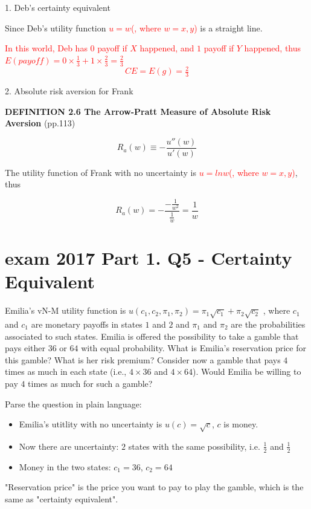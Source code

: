 \documentclass{article}
\begin{document}
1. Deb's certainty equivalent

Since Deb's utility function \textcolor{red}{$u = w$(, where $w = x,y$)} is a straight line.

\textcolor{red}{
In this world, Deb has $0$ payoff if $X$ happened, and $1$ payoff if $Y$ happened, thus $E(payoff) = 0 \times \tfrac1{3}   + 1 \times \tfrac2{3} =  \tfrac2{3}$
$$CE =  E(g) =  \tfrac2{3}$$}

2. Absolute risk aversion for Frank

\begin{mdframed}[backgroundcolor=blue!20,linecolor=white]
\textbf{DEFINITION 2.6 The Arrow-Pratt Measure of Absolute Risk Aversion} (pp.113)

$$R_a(w) \equiv -\frac{u''(w)}{u'(w)}$$

\end{mdframed}


The utility function of Frank with no uncertainty is \textcolor{red}{$u = ln  w $(, where $w = x,y$)}, thus

$$R_a(w) = -\frac{-\frac{1}{w^2}}{\frac{1}{w}}=\frac{1}{w}$$

\newpage 

\section{exam 2017 Part 1. Q5 - Certainty Equivalent}

Emilia's vN-M utility function is $u(c_1,c_2,\pi_1, \pi_2) = \pi_1 \sqrt{c_1} + \pi_2 \sqrt{c_2}$
, where $c_1$ and $c_1$ are
monetary payoffs in states $1$ and $2$ and $\pi_1$ and $\pi_2$ are the probabilities associated to such states.
Emilia is offered the possibility to take a gamble that pays either $36$ or $64$ with equal probability.
What is Emilia’s reservation price for this gamble? What is her risk premium?
Consider now a gamble that pays $4$ times as much in each state (i.e., $4 \times 36$ and $4 \times 64$). Would
Emilia be willing to pay $4$ times as much for such a gamble? 


\begin{mdframed}[backgroundcolor=blue!20,linecolor=white]
Parse the question in plain language:

\begin{itemize}
\item Emilia's utitlity with no uncertainty is $u(c) = \sqrt{c}$, $c$ is money.
\item Now there are uncertainty: $2$ states with the same possibility, i.e. $\frac{1}{2}$ and $\frac{1}{2}$
\item Money in the two states: $c_1 = 36$, $c_2 = 64$

\end{itemize}

"Reservation price" is the price you want to pay to play the gamble, which is the same as "certainty equivalent".
\end{mdframed}
\end{document}

